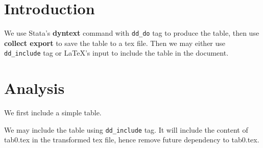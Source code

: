 \documentclass{ctexart}
\begin{document}
\section{Introduction}
We use Stata's \textbf{dyntext} command with \texttt{dd\_do} tag 
to produce the table, then use \textbf{collect export} to save 
the table to a tex file. Then we may either use 
\texttt{dd\_include} tag or LaTeX's input to include 
the table in the document. 

\section{Analysis}
We first include a simple table.

\iffalse
. use auto_zh.dta, clear
(1978年汽车数据)

. collect clear

. table (国籍 维修记录78) (), totals(维修记录78)

-------------------------------
                   |  Frequency
-------------------+-----------
国籍               |           
  国内             |           
    1978年维修记录 |           
      1            |          2
      2            |          8
      3            |         27
      4            |          9
      5            |          2
  国外             |           
    1978年维修记录 |           
      3            |          3
      4            |          9
      5            |          9
  Total            |           
    1978年维修记录 |           
      1            |          2
      2            |          8
      3            |         30
      4            |         18
      5            |         11
-------------------------------

. collect export tab0.tex, tableonly replace
(collection Table exported to file tab0.tex)

\fi

We may include the table using \texttt{dd\_include} tag. It will 
include the content of tab0.tex in the transformed tex file, hence 
remove future dependency to tab0.tex.  
\end{document}
